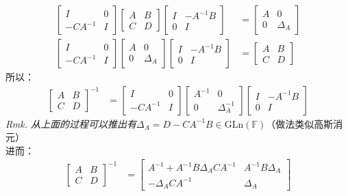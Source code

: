 \documentclass[cn,black,12pt,normal]{elegantnote}
\begin{document}
\begin{align*}
    \begin{bmatrix}
        I & 0 \\
        -CA^{-1} & I
    \end{bmatrix}\begin{bmatrix}
        A & B \\
        C & D
    \end{bmatrix}\begin{bmatrix}
        I & -A^{-1}B \\
        0 & I
    \end{bmatrix} & = \begin{bmatrix}
        A & 0 \\
        0 & \Delta_A
    \end{bmatrix} \\
    \begin{bmatrix}
        I & 0 \\
        -CA^{-1} & I
    \end{bmatrix}\begin{bmatrix}
        A & 0 \\
        0 & \Delta_A
    \end{bmatrix} \begin{bmatrix}
        I & -A^{-1}B \\
        0 & I
    \end{bmatrix} & = \begin{bmatrix}
        A & B \\
        C & D
    \end{bmatrix} 
\end{align*}
所以：
\begin{align*}
    \begin{bmatrix}
        A & B \\
        C & D
    \end{bmatrix}^{-1} & = 
    \begin{bmatrix}
        I & 0 \\
        -CA^{-1} & I
    \end{bmatrix}\begin{bmatrix}
        A^{-1} & 0 \\
        0 & \Delta_A^{-1}
    \end{bmatrix} \begin{bmatrix}
        I & -A^{-1}B \\
        0 & I
    \end{bmatrix}
\end{align*}
\textit{Rmk. 从上面的过程可以推出有}$\Delta_A = D - CA^{-1}B \in \text{GLn}(\mathbb{F} )$（做法类似高斯消元）
\\进而：
\begin{align*}
    \begin{bmatrix}
        A & B \\
        C & D
    \end{bmatrix}^{-1} & = 
    \begin{bmatrix}
        A^{-1}+A^{-1}B\Delta_ACA^{-1} & A^{-1}B\Delta_A \\
        -\Delta_ACA^{-1} & \Delta_A
    \end{bmatrix}
\end{align*}
\end{document}
